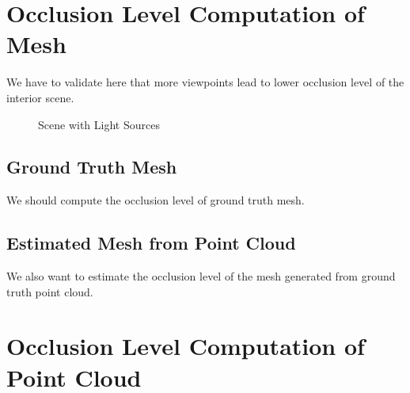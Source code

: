\documentclass[11pt, a4paper,oneside,chapterprefix=false]{scrbook}
\begin{document}
\section{Occlusion Level Computation of Mesh} \label{sec:occlusion}

We have to validate here that more viewpoints lead to lower occlusion level of the interior scene.

\begin{figure}[htp]
	\centering
	 \hfill
	\caption{Scene with Light Sources}
	\label{fig:scene with light sources}
\end{figure}


\subsection{Ground Truth Mesh} \label{subsec:occlusion}

We should compute the occlusion level of ground truth mesh.

\subsection{Estimated Mesh from Point Cloud} \label{subsec:occlusion}

We also want to estimate the occlusion level of the mesh generated from ground truth point cloud.

\section{Occlusion Level Computation of Point Cloud} \label{sec:occlusion}
\end{document}
